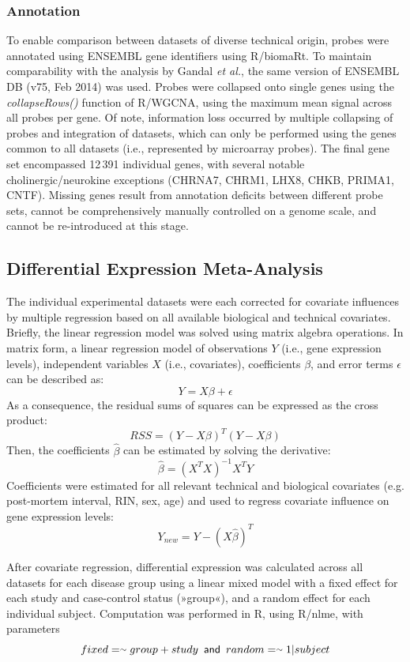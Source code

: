 \begin{method}
\subsubsection{Annotation}
To enable comparison between datasets of diverse technical origin, probes were annotated using ENSEMBL gene identifiers using R/biomaRt.\cite{Durinck2009} To maintain comparability with the analysis by Gandal \emph{et al.},\cite{Gandal2018} the same version of ENSEMBL DB (v75, Feb 2014) was used. Probes were collapsed onto single genes using the \emph{collapseRows()} function of R/WGCNA,\cite{Langfelder2008} using the maximum mean signal across all probes per gene. Of note, information loss occurred by multiple collapsing of probes and integration of datasets, which can only be performed using the genes common to all datasets (i.e., represented by microarray probes). The final gene set encompassed 12\,391 individual genes, with several notable cholinergic/neurokine exceptions (CHRNA7, CHRM1, LHX8, CHKB, PRIMA1, CNTF). Missing genes result from annotation deficits between different probe sets, cannot be comprehensively manually controlled on a genome scale, and cannot be re-introduced at this stage. 

\subsection{Differential Expression Meta-Analysis}
The individual experimental datasets were each corrected for covariate influences by multiple regression based on all available biological and technical covariates. Briefly, the linear regression model was solved using matrix algebra operations. In matrix form, a linear regression model of observations $Y$ (i.e., gene expression levels), independent variables $X$ (i.e., covariates), coefficients $\beta$, and error terms $\epsilon$ can be described as: $$Y = X\beta + \epsilon$$ As a consequence, the residual sums of squares can be expressed as the cross product: $$RSS = (Y - X\beta)^T(Y - X\beta)$$ Then, the coefficients $\hat{\beta}$ can be estimated by solving the derivative: $$\hat{\beta} = (X^TX)^{-1} X^TY$$ Coefficients were estimated for all relevant technical and biological covariates (e.g. post-mortem interval, RIN, sex, age) and used to regress covariate influence on gene expression levels: $$Y_{new} = Y - (X\hat{\beta})^T$$

After covariate regression, differential expression was calculated across all datasets for each disease group using a linear mixed model with a fixed effect for each study and case-control status (»group«), and a random effect for each individual subject. Computation was performed in R, using R/nlme,\cite{Pinheiro2019} with parameters $$fixed = \smallsim group + study\textrm{\sffamily\,\,\,and\,\,\,}random = \smallsim 1|subject$$


\end{method}
